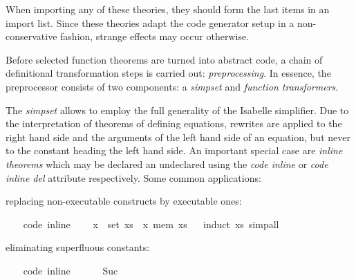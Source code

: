 \begin{isabellebody}
\begin{isamarkuptext}
  \begin{warn}
    When importing any of these theories, they should form the last
    items in an import list.  Since these theories adapt the
    code generator setup in a non-conservative fashion,
    strange effects may occur otherwise.
  \end{warn}%
\end{isamarkuptext}%
\isamarkuptrue%
%
\isamarkuptrue%
%
\begin{isamarkuptext}%
Before selected function theorems are turned into abstract
  code, a chain of definitional transformation steps is carried
  out: \emph{preprocessing}.  In essence, the preprocessor
  consists of two components: a \emph{simpset} and \emph{function transformers}.

  The \emph{simpset} allows to employ the full generality of the Isabelle
  simplifier.  Due to the interpretation of theorems
  of defining equations, rewrites are applied to the right
  hand side and the arguments of the left hand side of an
  equation, but never to the constant heading the left hand side.
  An important special case are \emph{inline theorems} which may be
  declared an undeclared using the
  \emph{code inline} or \emph{code inline del} attribute respectively.
  Some common applications:%
\end{isamarkuptext}%
\isamarkuptrue%
%
\begin{itemize}
%
\begin{isamarkuptext}%
\item replacing non-executable constructs by executable ones:%
\end{isamarkuptext}%
\isamarkuptrue%
\ \ \isamarkupfalse%
\ {\isacharbrackleft}code\ inline{\isacharbrackright}{\isacharcolon}\isanewline
\ \ \ \ {\isachardoublequoteopen}x\ {\isasymin}\ set\ xs\ {\isasymlongleftrightarrow}\ x\ mem\ xs{\isachardoublequoteclose}%
\isadelimproof
\ %
\endisadelimproof
%
\isatagproof
{}\isamarkupfalse%
\ {\isacharparenleft}induct\ xs{\isacharparenright}\ simp{\isacharunderscore}all%
\endisatagproof
{\isafoldproof}%
%
\isadelimproof
%
\endisadelimproof
%
\begin{isamarkuptext}%
\item eliminating superfluous constants:%
\end{isamarkuptext}%
\isamarkuptrue%
\ \ \isamarkupfalse%
\ {\isacharbrackleft}code\ inline{\isacharbrackright}{\isacharcolon}\isanewline
\ \ \ \ {\isachardoublequoteopen}{}\ {\isacharequal}\ Suc\ {}{\isachardoublequoteclose}%

\end{itemize}
\end{isabellebody}
